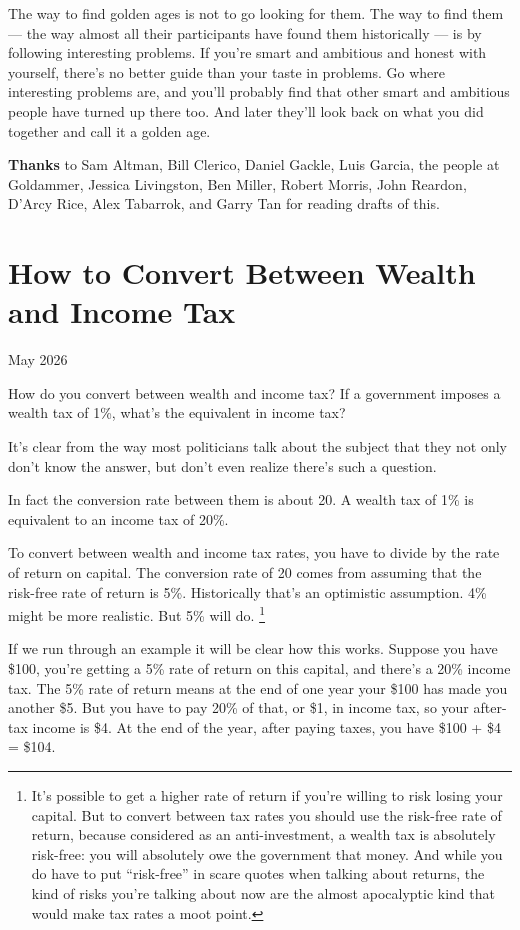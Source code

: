 \documentclass[12pt]{book}
\begin{document}
The way to find golden ages is not to go looking for them. The way to
find them --- the way almost all their participants have found them
historically --- is by following interesting problems. If you're smart
and ambitious and honest with yourself, there's no better guide than
your taste in problems. Go where interesting problems are, and you'll
probably find that other smart and ambitious people have turned up there
too. And later they'll look back on what you did together and call it a
golden age.


\textbf{Thanks} to Sam Altman, Bill Clerico, Daniel Gackle, Luis Garcia,
the people at Goldammer, Jessica Livingston, Ben Miller, Robert Morris,
John Reardon, D'Arcy Rice, Alex Tabarrok, and Garry Tan for reading
drafts of this.
\chapter{How to Convert Between Wealth and Income Tax}

May 2026

How do you convert between wealth and income tax? If a government
imposes a wealth tax of 1\%, what's the equivalent in income tax?

It's clear from the way most politicians talk about the subject that
they not only don't know the answer, but don't even realize there's such
a question.

In fact the conversion rate between them is about 20. A wealth tax of
1\% is equivalent to an income tax of 20\%.

To convert between wealth and income tax rates, you have to divide by
the rate of return on capital. The conversion rate of 20 comes from
assuming that the risk-free rate of return is 5\%. Historically that's
an optimistic assumption. 4\% might be more realistic. But 5\% will do.
\footnote{It's possible to get a higher rate of return if you're willing
to risk losing your capital. But to convert between tax rates you should
use the risk-free rate of return, because considered as an
anti-investment, a wealth tax is absolutely risk-free: you will
absolutely owe the government that money. And while you do have to put
``risk-free'' in scare quotes when talking about returns, the kind of
risks you're talking about now are the almost apocalyptic kind that
would make tax rates a moot point.}

If we run through an example it will be clear how this works. Suppose
you have \$100, you're getting a 5\% rate of return on this capital, and
there's a 20\% income tax. The 5\% rate of return means at the end of
one year your \$100 has made you another \$5. But you have to pay 20\%
of that, or \$1, in income tax, so your after-tax income is \$4. At the
end of the year, after paying taxes, you have \$100 + \$4 = \$104.
\end{document}
